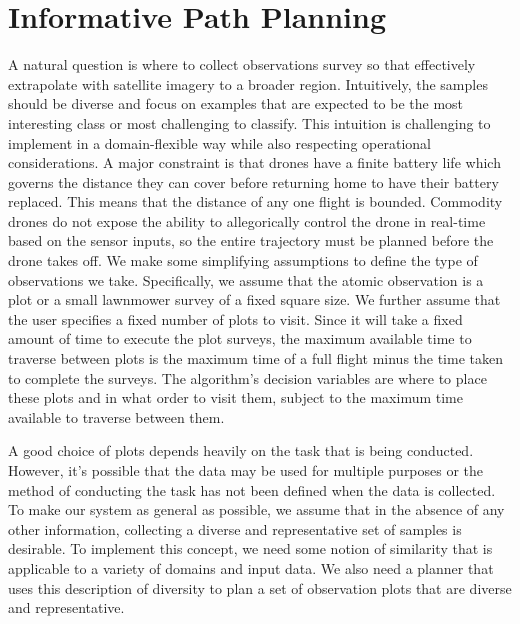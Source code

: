 \section{Informative Path Planning}
A natural question is where to collect observations survey so that effectively extrapolate with satellite imagery to a broader region. 
Intuitively, the samples should be diverse and focus on examples that are expected to be the most interesting class or most challenging to classify. This intuition is challenging to implement in a domain-flexible way while also respecting operational considerations.
A major constraint is that drones have a finite battery life which governs the distance they can cover before returning home to have their battery replaced. This means that the distance of any one flight is bounded. Commodity drones do not expose the ability to allegorically control the drone in real-time based on the sensor inputs, so the entire trajectory must be planned before the drone takes off.
We make some simplifying assumptions to define the type of observations we take. Specifically, we assume that the atomic observation is a plot or a small lawnmower survey of a fixed square size. We further assume that the user specifies a fixed number of plots to visit. Since it will take a fixed amount of time to execute the plot surveys, the maximum available time to traverse between plots is the maximum time of a full flight minus the time taken to complete the surveys. The algorithm's decision variables are where to place these plots and in what order to visit them, subject to the maximum time available to traverse between them.


A good choice of plots depends heavily on the task that is being conducted. However, it's possible that the data may be used for multiple purposes or the method of conducting the task has not been defined when the data is collected. To make our system as general as possible, we assume that in the absence of any other information, collecting a diverse and representative set of samples is desirable. To implement this concept, we need some notion of similarity that is applicable to a variety of domains and input data. We also need a planner that uses this description of diversity to plan a set of observation plots that are diverse and representative.


